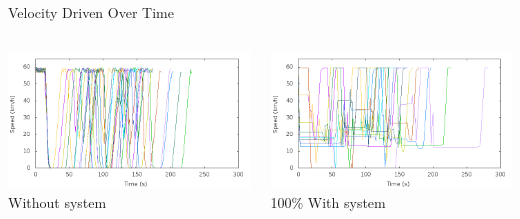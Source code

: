 \begin{frame}{Velocity Driven Over Time}
\begin{columns}
	\begin{column}{0.5\textwidth}
	\includegraphics[width=1\textwidth]{images/tp0/speed0.png}\\
	Without system
	\end{column}
	\begin{column}{0.5\textwidth}
	\includegraphics[width=1\textwidth]{images/tp0/speed100.png}\\
	100\% With system
	\end{column}
\end{columns}
\end{frame}
